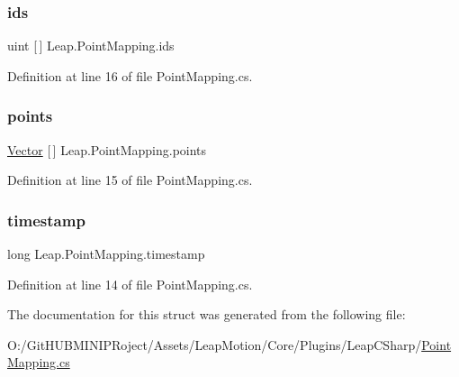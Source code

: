 \mbox{\label{struct_leap_1_1_point_mapping_aee8484f8049fce64ae4198ee1dc02c5a}} 
\subsubsection{\texorpdfstring{ids}{ids}}
{\footnotesize\ttfamily uint \mbox{[}$\,$\mbox{]} Leap.\+Point\+Mapping.\+ids}



Definition at line 16 of file Point\+Mapping.\+cs.

\mbox{\label{struct_leap_1_1_point_mapping_a017c93574f1f8e05f60094ba4060ca8b}} 
\subsubsection{\texorpdfstring{points}{points}}
{\footnotesize\ttfamily \mbox{\hyperlink{struct_leap_1_1_vector}{Vector}} \mbox{[}$\,$\mbox{]} Leap.\+Point\+Mapping.\+points}



Definition at line 15 of file Point\+Mapping.\+cs.

\mbox{\label{struct_leap_1_1_point_mapping_a3206170d16cbb4470c7439faeff0c003}} 
\subsubsection{\texorpdfstring{timestamp}{timestamp}}
{\footnotesize\ttfamily long Leap.\+Point\+Mapping.\+timestamp}



Definition at line 14 of file Point\+Mapping.\+cs.



The documentation for this struct was generated from the following file\+:\begin{DoxyCompactItemize}
\item 
O\+:/\+Git\+H\+U\+B\+M\+I\+N\+I\+P\+Roject/\+Assets/\+Leap\+Motion/\+Core/\+Plugins/\+Leap\+C\+Sharp/\mbox{\hyperlink{_point_mapping_8cs}{Point\+Mapping.\+cs}}\end{DoxyCompactItemize}
